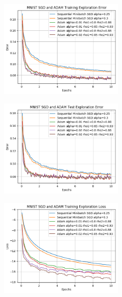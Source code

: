 \documentclass[10pt]{article}
\begin{document}
\begin{multicols}{2}
\begin{center}
    \includegraphics[width=0.45\textwidth]{SGDandADAMTrainingExplorationError.png}
\end{center}
\begin{center}
    \includegraphics[width=0.45\textwidth]{SGDandADAMTestExplorationError.png}
\end{center}
\begin{center}
    \includegraphics[width=0.45\textwidth]{SGDandADAMTrainingExplorationLoss.png}
\end{center}
\end{multicols}
\end{document}
